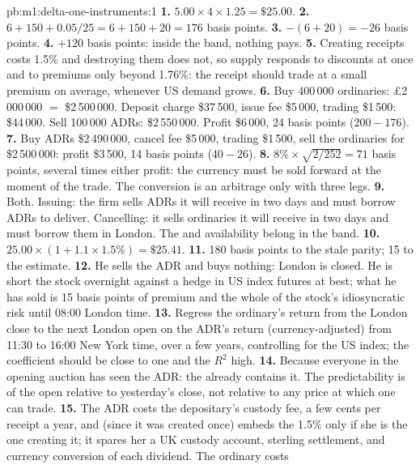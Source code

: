 \begin{solution}{pb:m1:delta-one-instruments:1}
\textbf{1.} $5.00 \times 4 \times 1.25 = \$25.00$.
\textbf{2.} $6 + 150 + 0.05/25 = 6 + 150 + 20 = 176$ basis points.
\textbf{3.} $-(6 + 20) = -26$ basis points.
\textbf{4.} $+120$ basis points: inside the band, nothing pays.
\textbf{5.} Creating receipts costs 1.5\% and destroying them does not, so
supply responds to discounts at once and to premiums only beyond 1.76\%: the
receipt should trade at a small premium on average, whenever US demand
grows.
\textbf{6.} Buy 400\,000 ordinaries: \pounds2\,000\,000 $=$ \$2\,500\,000.
Deposit charge \$37\,500, issue fee \$5\,000, trading \$1\,500: \$44\,000. Sell
100\,000 ADRs: \$2\,550\,000. Profit \$6\,000, 24 basis points ($200 - 176$).
\textbf{7.} Buy ADRs \$2\,490\,000, cancel fee \$5\,000, trading \$1\,500, sell
the ordinaries for \$2\,500\,000: profit \$3\,500, 14 basis points ($40 - 26$).
\textbf{8.} $8\% \times \sqrt{2/252} = 71$ basis points, several times either
profit: the currency must be sold forward at the moment of the trade. The
conversion is an arbitrage only with three legs.
\textbf{9.} Both. Issuing: the firm sells ADRs it will receive in two days
and must borrow ADRs to deliver. Cancelling: it sells ordinaries it will
receive in two days and must borrow them in London. The  and
availability belong in the band.
\textbf{10.} $25.00 \times (1 + 1.1 \times 1.5\%) = \$25.41$.
\textbf{11.} 180 basis points to the stale parity; 15 to the estimate.
\textbf{12.} He sells the ADR and buys nothing: London is closed. He is
short the stock overnight against a hedge in US index futures at best; what
he has sold is 15 basis points of premium and the whole of the stock's
idiosyncratic risk until 08:00 London time.
\textbf{13.} Regress the ordinary's return from the London close to the next
London open on the ADR's return (currency-adjusted) from 11:30 to 16:00 New
York time, over a few years, controlling for the US index; the coefficient
should be close to one and the $R^2$ high.
\textbf{14.} Because everyone in the opening auction has seen the ADR: the
 already contains it. The predictability is of the open
relative to yesterday's close, not relative to any price at which one can
trade.
\textbf{15.} The ADR costs the depositary's custody fee, a few cents per
receipt a year, and (since it was created once) embeds the 1.5\% only if she
is the one creating it; it spares her a UK custody account, sterling
settlement, and currency conversion of each dividend. The ordinary costs

\end{solution}
